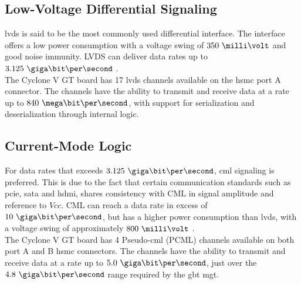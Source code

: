 \documentclass[main.tex]{subfiles}
\begin{document}
\subsection{Low-Voltage Differential Signaling}

\gls{lvds} is said to be the most commonly used differential interface. The interface offers a low power consumption with a voltage swing of $350\ \milli\volt$ and good noise immunity. LVDS can deliver data rates up to $3.125\ \giga\bit\per\second$ \cite{ti08lvds}.\\

The Cyclone V GT board has 17 \gls{lvds} channels available on the \gls{hsmc} port A connector. The channels have the ability to transmit and receive data at a rate up to $840\ \mega\bit\per\second$, with support for serialization and deserialization through internal logic. \cite{altera_cvoverview15}

\subsection{Current-Mode Logic}

For data rates that exceeds $3.125\ \giga\bit\per\second$, \gls{cml} signaling is preferred. This is due to the fact that certain communication standards such as \acrshort{pcie}, \acrshort{sata} and \acrshort{hdmi}, shares consistency with CML in signal amplitude and reference to $Vcc$. CML can reach a data rate in excess of $10\ \giga\bit\per\second$, but has a higher power consumption than \gls{lvds}, with a voltage swing of approximately $800\ \milli\volt$ \cite{ti08lvds}.\\

The Cyclone V GT board has 4 Pseudo-\gls{cml} (PCML) channels available on both port A and B \gls{hsmc} connectors. The channels have the ability to transmit and receive data at a rate up to $5.0\ \giga\bit\per\second$, just over the $4.8\ \giga\bit\per\second$ range required by the \gls{gbt} \gls{mgt}. \cite{altera_cyclonekit}




\end{document}
